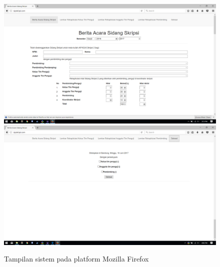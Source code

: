 \begin{figure}[H]
	\centering
	\includegraphics[scale=0.4]{Gambar/Mozila}
	\includegraphics[scale=0.4]{Gambar/MozilaSelesai}
	\caption{Tampilan sistem pada platform Mozilla Firefox}
	\label{fig:Mozila}
\end{figure}

